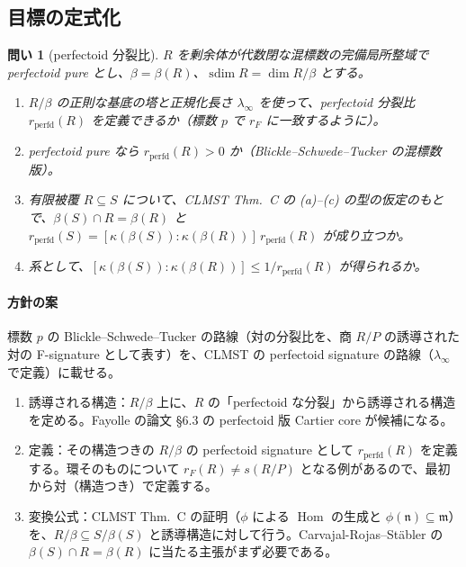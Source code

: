\documentclass[11pt,a4paper]{ltjsarticle}
\theoremstyle{plain}
\newtheorem{question}{問い}
\theoremstyle{definition}
\theoremstyle{remark}
\theoremstyle{plain}
\newcommand{\m}{\mathfrak{m}}
\newcommand{\n}{\mathfrak{n}}
\newcommand{\Hom}{\operatorname{Hom}}
\begin{document}
\subsection{目標の定式化}
\begin{question}[perfectoid 分裂比]
$R$ を剰余体が代数閉な混標数の完備局所整域で perfectoid pure とし、$\beta = \beta(R)$、$\operatorname{sdim}R = \dim R/\beta$ とする。
\begin{enumerate}
  \item $R/\beta$ の正則な基底の塔と正規化長さ $\lambda_\infty$ を使って、perfectoid 分裂比 $r_{\mathrm{perfd}}(R)$ を定義できるか（標数 $p$ で $r_F$ に一致するように）。
  \item perfectoid pure なら $r_{\mathrm{perfd}}(R)>0$ か（Blickle--Schwede--Tucker の混標数版）。
  \item 有限被覆 $R\subseteq S$ について、CLMST Thm.~C の (a)--(c) の型の仮定のもとで、$\beta(S)\cap R = \beta(R)$ と $r_{\mathrm{perfd}}(S) = [\kappa(\beta(S)):\kappa(\beta(R))]\,r_{\mathrm{perfd}}(R)$ が成り立つか。
  \item 系として、$[\kappa(\beta(S)):\kappa(\beta(R))]\le 1/r_{\mathrm{perfd}}(R)$ が得られるか。
\end{enumerate}
\end{question}

\paragraph{方針の案}
標数 $p$ の Blickle--Schwede--Tucker の路線（対の分裂比を、商 $R/P$ の誘導された対の F-signature として表す）を、CLMST の perfectoid signature の路線（$\lambda_\infty$ で定義）に載せる。
\begin{enumerate}
  \item 誘導される構造：$R/\beta$ 上に、$R$ の「perfectoid な分裂」から誘導される構造を定める。Fayolle の論文 §6.3 の perfectoid 版 Cartier core が候補になる。
  \item 定義：その構造つきの $R/\beta$ の perfectoid signature として $r_{\mathrm{perfd}}(R)$ を定義する。環そのものについて $r_F(R)\ne s(R/P)$ となる例があるので、最初から対（構造つき）で定義する。
  \item 変換公式：CLMST Thm.~C の証明（$\phi$ による $\Hom$ の生成と $\phi(\n)\subseteq\m$）を、$R/\beta\subseteq S/\beta(S)$ と誘導構造に対して行う。Carvajal-Rojas--Stäbler の $\beta(S)\cap R = \beta(R)$ に当たる主張がまず必要である。
\end{enumerate}
\end{document}
